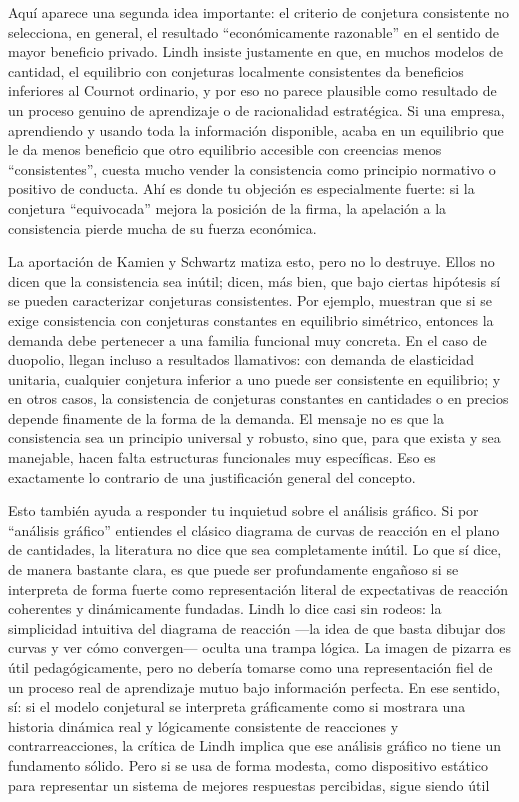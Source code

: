 \documentclass[10pt,a4paper]{article}
\begin{document}
Aquí aparece una segunda idea importante: el criterio de conjetura consistente no selecciona, en general, el resultado “económicamente razonable” en el sentido de mayor beneficio privado. Lindh insiste justamente en que, en muchos modelos de cantidad, el equilibrio con conjeturas localmente consistentes da beneficios inferiores al Cournot ordinario, y por eso no parece plausible como resultado de un proceso genuino de aprendizaje o de racionalidad estratégica. Si una empresa, aprendiendo y usando toda la información disponible, acaba en un equilibrio que le da menos beneficio que otro equilibrio accesible con creencias menos “consistentes”, cuesta mucho vender la consistencia como principio normativo o positivo de conducta. Ahí es donde tu objeción es especialmente fuerte: si la conjetura “equivocada” mejora la posición de la firma, la apelación a la consistencia pierde mucha de su fuerza económica. 

La aportación de Kamien y Schwartz matiza esto, pero no lo destruye. Ellos no dicen que la consistencia sea inútil; dicen, más bien, que bajo ciertas hipótesis sí se pueden caracterizar conjeturas consistentes. Por ejemplo, muestran que si se exige consistencia con conjeturas constantes en equilibrio simétrico, entonces la demanda debe pertenecer a una familia funcional muy concreta. En el caso de duopolio, llegan incluso a resultados llamativos: con demanda de elasticidad unitaria, cualquier conjetura inferior a uno puede ser consistente en equilibrio; y en otros casos, la consistencia de conjeturas constantes en cantidades o en precios depende finamente de la forma de la demanda. El mensaje no es que la consistencia sea un principio universal y robusto, sino que, para que exista y sea manejable, hacen falta estructuras funcionales muy específicas. Eso es exactamente lo contrario de una justificación general del concepto.  

Esto también ayuda a responder tu inquietud sobre el análisis gráfico. Si por “análisis gráfico” entiendes el clásico diagrama de curvas de reacción en el plano de cantidades, la literatura no dice que sea completamente inútil. Lo que sí dice, de manera bastante clara, es que puede ser profundamente engañoso si se interpreta de forma fuerte como representación literal de expectativas de reacción coherentes y dinámicamente fundadas. Lindh lo dice casi sin rodeos: la simplicidad intuitiva del diagrama de reacción —la idea de que basta dibujar dos curvas y ver cómo convergen— oculta una trampa lógica. La imagen de pizarra es útil pedagógicamente, pero no debería tomarse como una representación fiel de un proceso real de aprendizaje mutuo bajo información perfecta. En ese sentido, sí: si el modelo conjetural se interpreta gráficamente como si mostrara una historia dinámica real y lógicamente consistente de reacciones y contrarreacciones, la crítica de Lindh implica que ese análisis gráfico no tiene un fundamento sólido. Pero si se usa de forma modesta, como dispositivo estático para representar un sistema de mejores respuestas percibidas, sigue siendo útil
\end{document}
